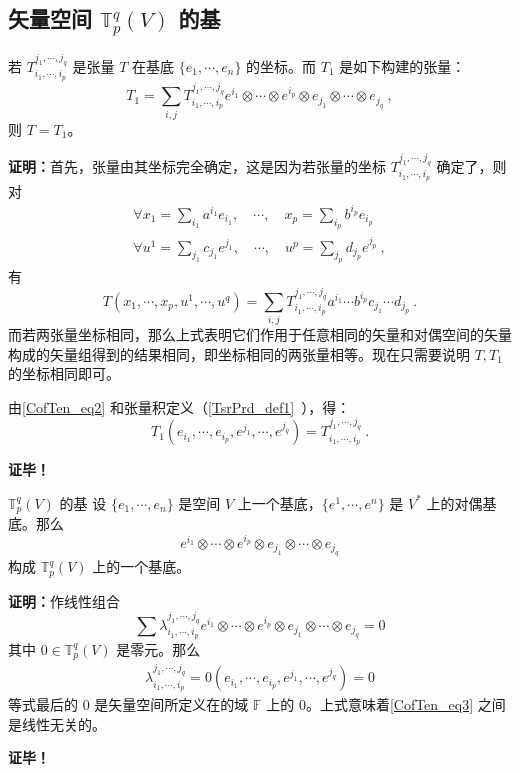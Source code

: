 \subsection{矢量空间 $\mathbb T^q_p(V)$ 的基}
\begin{theorem}{}\label{CofTen_the1}
若 $T^{j_1,\cdots,j_q}_{i_1,\cdots,i_p}$ 是张量 $T$ 在基底 $\{e_1,\cdots,e_n\}$ 的坐标。而 $T_1$ 是如下构建的张量：
\begin{equation}\label{CofTen_eq2}
T_1=\sum_{i,j}T^{j_1,\cdots,j_q}_{i_1,\cdots,i_p}e^{i_1}\otimes\cdots\otimes e^{i_p}\otimes e_{j_1}\otimes\cdots\otimes e_{j_q}~,
\end{equation}
则 $T=T_1$。
\end{theorem}
\textbf{证明：}首先，张量由其坐标完全确定，这是因为若张量的坐标 $T^{j_1,\cdots,j_q}_{i_1,\cdots,i_p}$ 确定了，则对
\begin{equation}
\begin{aligned}
\forall x_1=\sum_{i_1}a^{i_1}e_{i_1},\quad\cdots,\quad x_p=\sum_{i_p}b^{i_p}e_{i_p}\\
\forall u^1=\sum_{j_1}c_{j_1}e^{j_1},\quad\cdots,\quad u^p=\sum_{j_p}d_{j_p}e^{j_p}~,
\end{aligned}
\end{equation}
有 
\begin{equation}\label{CofTen_eq1}
T(x_1,\cdots,x_p,u^1,\cdots,u^q)=\sum_{i,j}T^{j_1,\cdots,j_q}_{i_1,\cdots,i_p}a^{i_1}\cdots b^{i_p}c_{j_1}\cdots d_{j_p}~.
\end{equation}
而若两张量坐标相同，那么上式表明它们作用于任意相同的矢量和对偶空间的矢量构成的矢量组得到的结果相同，即坐标相同的两张量相等。现在只需要说明 $T,T_1$ 的坐标相同即可。

由\autoref{CofTen_eq2} 和张量积定义（\autoref{TsrPrd_def1}~），得：
\begin{equation}
T_1(e_{i_1},\cdots,e_{i_p},e^{j_1},\cdots,e^{j_q})=T^{j_1,\cdots,j_q}_{i_1,\cdots,i_p}~.
\end{equation}

\textbf{证毕！}
 \begin{theorem}{ $\mathbb T^q_p(V)$ 的基}\label{CofTen_the2}
 设 $\{e_1,\cdots,e_n\}$ 是空间 $V$ 上一个基底，$\{e^1,\cdots,e^n\}$ 是 $V^*$ 上的对偶基底。那么
\begin{equation}\label{CofTen_eq3}
e^{i_1}\otimes\cdots\otimes e^{i_p}\otimes e_{j_1}\otimes\cdots\otimes e_{j_q}
\end{equation}
构成 $\mathbb T_p^q(V)$ 上的一个基底。 
 \end{theorem}
 \textbf{证明：}作线性组合
 \begin{equation}
 \sum\lambda^{j_1,\cdots,j_q}_{i_1,\cdots,i_p}e^{i_1}\otimes\cdots\otimes e^{i_p}\otimes e_{j_1}\otimes\cdots\otimes e_{j_q}=0
 \end{equation}
 其中 $0\in \mathbb T^q_p(V)$ 是零元。那么
 \begin{equation}
 \begin{aligned}
 \lambda^{j_1,\cdots,j_q}_{i_1,\cdots,i_p}=0(e_{i_1},\cdots,e_{i_p},e^{j_1},\cdots,e^{j_q})=0
 \end{aligned}
 \end{equation}
等式最后的 $0$ 是矢量空间所定义在的域 $\mathbb F$ 上的 $0$。上式意味着\autoref{CofTen_eq3} 之间是线性无关的。

\textbf{证毕！}